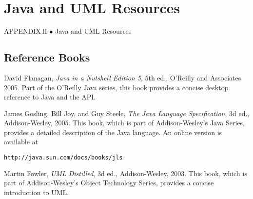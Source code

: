 \setcounter{table}{0}
\setcounter{figure}{0}
\renewcommand{\thetable}{\mbox{H.\arabic{table}}}%
\renewcommand{\thefigure}{\mbox{H--\arabic{figure}}}%
%

\chapter{Java and UML Resources}

{{\color{cyan}APPENDIX\,H\,\,$\bullet$\,\,}Java and UML Resources}

\section*{Reference Books}
\begin{BL}

\item  David Flanagan, {\it Java in a Nutshell Edition 5}, 5th ed.,
O'Reilly and Associates 2005. Part of the O'Reilly Java series, this
book provides a concise desktop reference to Java and the API.

\item  James Gosling, Bill Joy, and Guy Steele, {\it The Java
Language Specification}, 3d ed., Addison-Wesley, 2005. This book,
which is part of Addison-Wesley's Java Series, provides a detailed
description of the Java language.  An online version is available at

\WWW
\begin{jjjlisting}
\begin{lstlisting}[commentstyle=\color{black}]
http://java.sun.com/docs/books/jls
\end{lstlisting}
\end{jjjlisting}

\item  Martin Fowler, {\it UML Distilled}, 3d ed., 
Addison-Wesley, 2003. This book, which is part of Addison-Wesley's
Object Technology Series, provides a concise introduction to UML.
\end{BL}

